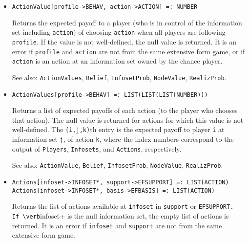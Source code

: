 \begin{itemize}
\item{}
\protect \large \begin{verbatim}
ActionValue[profile->BEHAV, action->ACTION] =: NUMBER 
\end{verbatim}\normalsize

\bd 
Returns the expected payoff to a player (who is in control of the
information set including \verb+action+) of choosing \verb+action+ when
all players are following \verb+profile+.  If the value is not
well-defined, the null value is returned.  It is an error if
\verb+profile+ and \verb+action+ are not from the same extensive form
game, or if \verb+action+ is an action at an information set owned by
the chance player.

\item [See also:] \verb+ActionValues+, \verb+Belief+,
\verb+InfosetProb+, \verb+NodeValue+, \verb+RealizProb+.  
\ed

\item{}
\protect \large \begin{verbatim}
ActionValues[profile->BEHAV] =: LIST(LIST(LIST(NUMBER))) 
\end{verbatim}\normalsize

\bd
Returns a list of expected payoffs of each action (to the player
who chooses that action).  The null value is returned for actions for
which this value is not well-defined.  The \verb+(i,j,k)+th entry is
the expected payoff to player \verb+i+ at information set \verb+j+, of
action \verb+k+, where the index numbers correspond to the output of
\verb+Players+, \verb+Infosets+, and \verb+Actions+, respectively.

\item [See also:] \verb+ActionValue+, \verb+Belief+,
\verb+InfosetProb+, \verb+NodeValue+, \verb+RealizProb+.  
\ed

\item{}
\protect \large \begin{verbatim} 
Actions[infoset->INFOSET*, support->EFSUPPORT] =: LIST(ACTION) 
Actions[infoset->INFOSET*, basis->EFBASIS] =: LIST(ACTION) 
\end{verbatim}\normalsize

\bd
Returns the list of actions available at \verb+infoset+ in
\verb+support+ or \verb+EFSUPPORT.  If \verb+infoset+ is the null
information set, the empty list of actions is returned.  It is an
error if \verb+infoset+ and \verb+support+ are not from the same
extensive form game.


\end{itemize}
